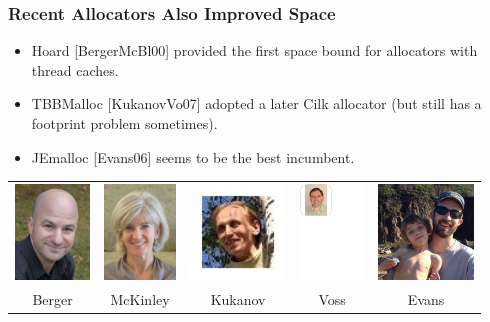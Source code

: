 \documentclass[xcolor=dvipsnames,14pt]{beamer}
\begin{document}
\begin{frame}[fragile]
\frametitle{Recent Allocators Also Improved Space}

\begin{itemize}
\item Hoard [BergerMcBl00] provided the first space bound for allocators
with thread caches. 
\item TBBMalloc [KukanovVo07] adopted a later Cilk allocator (but still has a footprint problem sometimes).
\item JEmalloc [Evans06] seems to be the best incumbent.
\end{itemize}

{\tiny
\begin{tabular}{c@{}c@{}c@{}c@{}c}
\includegraphics[height=1in]{pictures/emery-berger-headshot.jpg}&
\includegraphics[height=1in]{pictures/mckinley.jpg}&
\includegraphics[height=1in]{pictures/kukanov.jpg}&
\includegraphics[height=1in]{pictures/voss.jpg}&
\includegraphics[height=1in]{pictures/evans-headshot.jpg}
\\ Berger & McKinley & Kukanov & Voss & Evans 
\end{tabular}
}
\end{frame}
\end{document}
